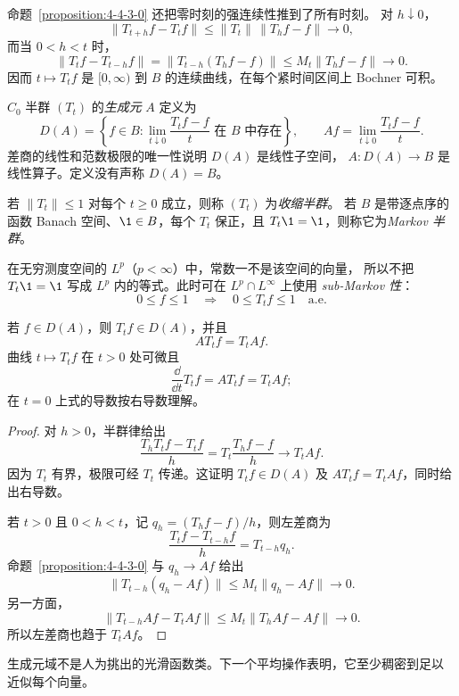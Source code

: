 命题~\ref{proposition:4-4-3-0} 还把零时刻的强连续性推到了所有时刻。
对 $h\downarrow0$，
\[
 \|T_{t+h}f-T_tf\|\le\|T_t\|\,\|T_hf-f\|\longrightarrow0,
\]
而当 $0<h<t$ 时，
\[
 \|T_tf-T_{t-h}f\|
 =\|T_{t-h}(T_hf-f)\|
 \le M_t\|T_hf-f\|\longrightarrow0.
\]
因而 $t\mapsto T_tf$ 是 $[0,\infty)$ 到 $B$ 的连续曲线，在每个紧时间区间上
Bochner 可积。

\begin{definition}[生成元]\label{def:4-4-3-2}
$C_0$ 半群 $(T_t)$ 的\emph{生成元} $A$ 定义为
\[
 D(A)=\left\{f\in B:
   \lim_{t\downarrow0}\frac{T_tf-f}{t}
   \text{ 在 $B$ 中存在}\right\},
 \qquad
 Af=\lim_{t\downarrow0}\frac{T_tf-f}{t}.
\]
差商的线性和范数极限的唯一性说明 $D(A)$ 是线性子空间，
$A:D(A)\to B$ 是线性算子。定义没有声称 $D(A)=B$。
\end{definition}

\begin{definition}\label{def:4-4-3-3}
若 $\|T_t\|\le1$ 对每个 $t\ge0$ 成立，则称 $(T_t)$ 为\emph{收缩半群}。
若 $B$ 是带逐点序的函数 Banach 空间、$\1\in B$，每个 $T_t$ 保正，且
$T_t\1=\1$，则称它为\emph{Markov 半群}。

在无穷测度空间的 $L^p$（$p<\infty$）中，常数一不是该空间的向量，
所以不把 $T_t\1=\1$ 写成 $L^p$ 内的等式。此时可在 $L^p\cap L^\infty$ 上使用
\emph{sub-Markov 性}：
\[
  0\le f\le1\quad\Longrightarrow\quad0\le T_tf\le1
  \quad\text{a.e.}
\]
\end{definition}

\begin{proposition}[轨道微分]\label{proposition:4-4-3-1}
若 $f\in D(A)$，则 $T_tf\in D(A)$，并且
\[
  AT_tf=T_tAf.
\]
曲线 $t\mapsto T_tf$ 在 $t>0$ 处可微且
\[
  \frac{\dd}{\dd t}T_tf=AT_tf=T_tAf;
\]
在 $t=0$ 上式的导数按右导数理解。
\end{proposition}

\begin{proof}
对 $h>0$，半群律给出
\[
 \frac{T_hT_tf-T_tf}{h}
 =T_t\frac{T_hf-f}{h}\longrightarrow T_tAf.
\]
因为 $T_t$ 有界，极限可经 $T_t$ 传递。这证明
$T_tf\in D(A)$ 及 $AT_tf=T_tAf$，同时给出右导数。

若 $t>0$ 且 $0<h<t$，记 $q_h=(T_hf-f)/h$，则左差商为
\[
 \frac{T_tf-T_{t-h}f}{h}=T_{t-h}q_h.
\]
命题~\ref{proposition:4-4-3-0} 与 $q_h\to Af$ 给出
\[
 \|T_{t-h}(q_h-Af)\|\le M_t\|q_h-Af\|\longrightarrow0.
\]
另一方面，
\[
 \|T_{t-h}Af-T_tAf\|
 \le M_t\|T_hAf-Af\|\longrightarrow0.
\]
所以左差商也趋于 $T_tAf$。
\end{proof}

生成元域不是人为挑出的光滑函数类。下一个平均操作表明，它至少稠密到足以
近似每个向量。

